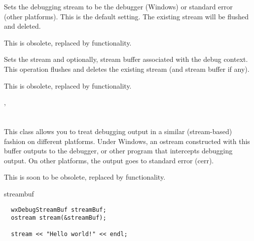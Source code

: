 \label{wxdebugcontextsetstandarderror}


Sets the debugging stream to be the debugger (Windows) or standard error (other platforms).
This is the default setting. The existing stream will be flushed and deleted.

This is obsolete, replaced by  functionality.

\label{wxdebugcontextsetstream}


Sets the stream and optionally, stream buffer associated with the debug context.
This operation flushes and deletes the existing stream (and stream buffer if any).

This is obsolete, replaced by  functionality.





, 

\section{}\label{wxdebugstreambuf}

This class allows you to treat debugging output in a similar
(stream-based) fashion on different platforms. Under
Windows, an ostream constructed with this buffer outputs
to the debugger, or other program that intercepts debugging
output. On other platforms, the output goes to standard error (cerr).

This is soon to be obsolete, replaced by  functionality.


streambuf


\begin{verbatim}
  wxDebugStreamBuf streamBuf;
  ostream stream(&streamBuf);

  stream << "Hello world!" << endl;
\end{verbatim}




